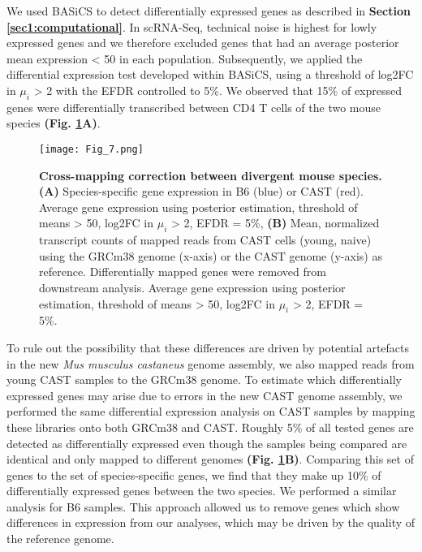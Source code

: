 We used BASiCS \citep{Vallejos2016} to detect differentially expressed genes as described in \textbf{Section \ref{sec1:computational}}. In scRNA-Seq, technical noise is highest for lowly expressed genes \citep{Brennecke2013} and we therefore excluded genes that had an average posterior mean expression < 50 in each population. Subsequently, we applied the differential expression test developed within BASiCS, using a threshold of log2FC in $\mu_i$ > 2 with the EFDR controlled to 5\%. We observed that 15\% of expressed genes were differentially transcribed between CD4\plus{} T cells of the two mouse species \textbf{(Fig. \ref{fig1:spec_spec_mapping}A)}. 

\begin{figure}[!hb]
\centering
\texttt{[image: Fig\_7.png]}
\caption[Cross-mapping correction between divergent mouse species]{\textbf{Cross-mapping correction between divergent mouse species.}\\
\textbf{(A)} Species-specific gene expression in B6 (blue) or CAST (red). Average gene expression using posterior estimation, threshold of means > 50, log2FC in $\mu_i$ > 2, EFDR = 5\%, \textbf{(B)} Mean, normalized transcript counts of mapped reads from CAST cells (young, naive) using the GRCm38 genome (x-axis) or the CAST genome (y-axis) as reference. Differentially mapped genes were removed from downstream analysis. Average gene expression using posterior estimation, threshold of means > 50, log2FC in $\mu_i$ > 2, EFDR = 5\%.
}
\label{fig1:spec_spec_mapping}
\end{figure}

To rule out the possibility that these differences are driven by potential artefacts in the new \textit{Mus musculus castaneus} genome assembly, we also mapped reads from young CAST samples to the GRCm38 genome. To estimate which differentially expressed genes may arise due to errors in the new CAST genome assembly, we performed the same differential expression analysis on CAST samples by mapping these libraries onto both GRCm38 and CAST. Roughly 5\% of all tested genes are detected as differentially expressed even though the samples being compared are identical and only mapped to different genomes \textbf{(Fig. \ref{fig1:spec_spec_mapping}B)}. Comparing this set of genes to the set of species-specific genes, we find that they make up 10\% of differentially expressed genes between the two species. We performed a similar analysis for B6 samples. This approach allowed us to remove genes which show differences in expression from our analyses, which may be driven by the quality of the reference genome.

